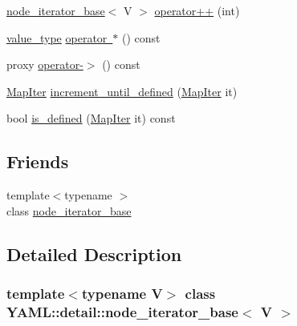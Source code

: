 \begin{DoxyCompactItemize}
\item 
\mbox{\hyperlink{class_y_a_m_l_1_1detail_1_1node__iterator__base}{node\+\_\+iterator\+\_\+base}}$<$ V $>$ \mbox{\hyperlink{class_y_a_m_l_1_1detail_1_1node__iterator__base_aab470f2db1a20cae06f6fd90535e5ef6}{operator++}} (int)
\item 
\mbox{\hyperlink{class_y_a_m_l_1_1detail_1_1node__iterator__base_ac091253ed737c52668c9f9d84bdfd777}{value\+\_\+type}} \mbox{\hyperlink{class_y_a_m_l_1_1detail_1_1node__iterator__base_a324b02524e04bba795507717d0414cfb}{operator $\ast$}} () const
\item 
proxy \mbox{\hyperlink{class_y_a_m_l_1_1detail_1_1node__iterator__base_a54424b0334f6f91ffd03609516d90cc5}{operator-\/$>$}} () const
\item 
\mbox{\hyperlink{class_y_a_m_l_1_1detail_1_1node__iterator__base_aaa2316d6fa0080ad766fc2429f7a68ed}{Map\+Iter}} \mbox{\hyperlink{class_y_a_m_l_1_1detail_1_1node__iterator__base_aa8afc276a387c723b8cf14e650b337a5}{increment\+\_\+until\+\_\+defined}} (\mbox{\hyperlink{class_y_a_m_l_1_1detail_1_1node__iterator__base_aaa2316d6fa0080ad766fc2429f7a68ed}{Map\+Iter}} it)
\item 
bool \mbox{\hyperlink{class_y_a_m_l_1_1detail_1_1node__iterator__base_a9cd060bc5fb325a54705df7dd79f6e71}{is\+\_\+defined}} (\mbox{\hyperlink{class_y_a_m_l_1_1detail_1_1node__iterator__base_aaa2316d6fa0080ad766fc2429f7a68ed}{Map\+Iter}} it) const
\end{DoxyCompactItemize}
\subsection*{Friends}
\begin{DoxyCompactItemize}
\item 
{\footnotesize template$<$typename $>$ }\\class \mbox{\hyperlink{class_y_a_m_l_1_1detail_1_1node__iterator__base_af888868b67b8d48112c86fd093ebd2a1}{node\+\_\+iterator\+\_\+base}}
\end{DoxyCompactItemize}


\subsection{Detailed Description}
\subsubsection*{template$<$typename V$>$\newline
class Y\+A\+M\+L\+::detail\+::node\+\_\+iterator\+\_\+base$<$ V $>$}



